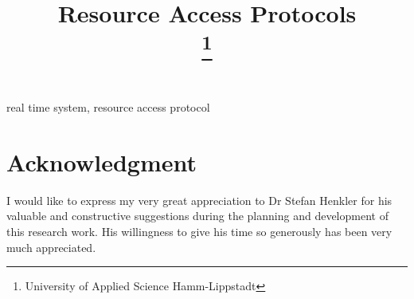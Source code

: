 \documentclass[conference]{IEEEtran}
\begin{document}
\title{Resource Access Protocols\\
{\footnotesize }
\thanks{University of Applied Science Hamm-Lippstadt}
}

\author{

}

\maketitle


\begin{IEEEkeywords}
real time system, resource access protocol 
\end{IEEEkeywords}














\section*{Acknowledgment}

I would like to express my very great appreciation to Dr Stefan Henkler  for his valuable and constructive suggestions during the planning and development of this research work. His willingness to give his time so generously has been very much appreciated.




 
\cite{*}
\end{document}
